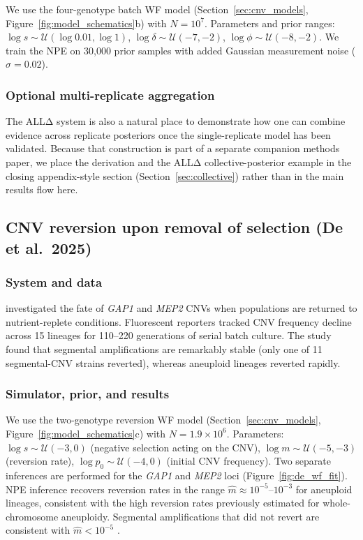 \documentclass[11pt]{article}
\begin{document}
We use the four-genotype batch WF model
(Section~\ref{sec:cnv_models}, Figure~\ref{fig:model_schematics}b) with
$N = 10^7$.
Parameters and prior ranges:
$\log s \sim \mathcal{U}(\log 0.01, \log 1)$,
$\log \delta \sim \mathcal{U}(-7, -2)$,
$\log \phi \sim \mathcal{U}(-8, -2)$.
We train the NPE on 30,000 prior samples with added Gaussian measurement
noise ($\sigma = 0.02$).

\subsubsection{Optional multi-replicate aggregation}

The ALLΔ system is also a natural place to demonstrate how one can combine
evidence across replicate posteriors once the single-replicate model has been
validated.
Because that construction is part of a separate companion methods paper, we
place the derivation and the ALLΔ collective-posterior example in the
closing appendix-style section (Section~\ref{sec:collective}) rather than in
the main results flow here.

\subsection{CNV reversion upon removal of selection (De et al.\ 2025)}
\label{sec:de}

\subsubsection{System and data}

\citet{de2025segmental} investigated the fate of \emph{GAP1} and \emph{MEP2}
CNVs when populations are returned to nutrient-replete conditions.
Fluorescent reporters tracked CNV frequency decline across 15 lineages for
110--220 generations of serial batch culture.
The study found that segmental amplifications are remarkably stable (only one
of 11 segmental-CNV strains reverted), whereas aneuploid lineages reverted
rapidly.

\subsubsection{Simulator, prior, and results}

We use the two-genotype reversion WF model
(Section~\ref{sec:cnv_models}, Figure~\ref{fig:model_schematics}c) with
$N = 1.9\times10^6$.
Parameters:
$\log s \sim \mathcal{U}(-3, 0)$ (negative selection acting on the CNV),
$\log m \sim \mathcal{U}(-5, -3)$ (reversion rate),
$\log p_0 \sim \mathcal{U}(-4, 0)$ (initial CNV frequency).
Two separate inferences are performed for the \emph{GAP1} and \emph{MEP2}
loci (Figure~\ref{fig:de_wf_fit}).
NPE inference recovers reversion rates in the range
$\hat m \approx 10^{-5}$--$10^{-3}$ for aneuploid lineages, consistent with
the high reversion rates previously estimated for whole-chromosome aneuploidy.
Segmental amplifications that did not revert are consistent with
$\hat m < 10^{-5}$ \citep{de2025segmental}.
\end{document}
